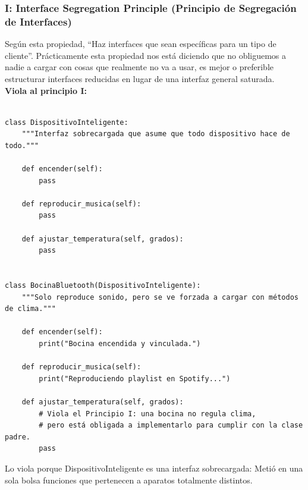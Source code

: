 \documentclass{article}
\begin{document}
    		\subsubsection*{I: Interface Segregation Principle (Principio de Segregación de Interfaces)}
        		Según esta propiedad, “Haz interfaces que sean específicas para un tipo de cliente”. Prácticamente esta propiedad 
				nos está diciendo que no obliguemos a nadie a cargar con cosas que realmente no va a usar, es mejor o preferible estructurar
		 		interfaces reducidas en lugar de una interfaz general saturada.\\ 

        		\textbf{Viola al principio I:}

        		\begin{verbatim}

class DispositivoInteligente:
    """Interfaz sobrecargada que asume que todo dispositivo hace de todo."""

    def encender(self):
        pass

    def reproducir_musica(self):
        pass

    def ajustar_temperatura(self, grados):
        pass


class BocinaBluetooth(DispositivoInteligente):
    """Solo reproduce sonido, pero se ve forzada a cargar con métodos de clima."""

    def encender(self):
        print("Bocina encendida y vinculada.")

    def reproducir_musica(self):
        print("Reproduciendo playlist en Spotify...")

    def ajustar_temperatura(self, grados):
        # Viola el Principio I: una bocina no regula clima,
        # pero está obligada a implementarlo para cumplir con la clase padre.
        pass

        		\end{verbatim}
        		Lo viola porque DispositivoInteligente es una interfaz sobrecargada: Metió en una sola bolsa funciones que pertenecen
				 a aparatos totalmente distintos.\\ \\
 	
\end{document}
